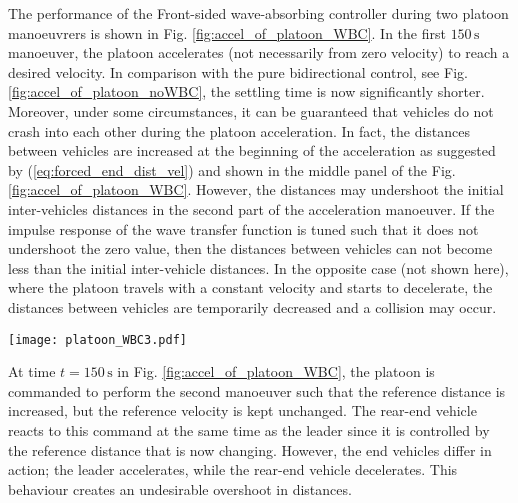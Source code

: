 \documentclass[final,5p,times,twocolumn]{elsarticle}
\begin{document}
The performance of the Front-sided wave-absorbing controller during two platoon manoeuvrers is shown in Fig. \ref{fig:accel_of_platoon_WBC}. In the first $150\,\text{s}$ manoeuver, the platoon accelerates (not necessarily from zero velocity) to reach a desired velocity. In comparison with the pure bidirectional control, see Fig. \ref{fig:accel_of_platoon_noWBC}, the settling time is now significantly shorter. Moreover, under some circumstances, it can be guaranteed that vehicles do not crash into each other during the platoon acceleration. In fact, the distances between vehicles are increased at the beginning of the acceleration as suggested by (\ref{eq:forced_end_dist_vel}) and shown in the middle panel of the Fig. \ref{fig:accel_of_platoon_WBC}. However, the distances may undershoot the initial inter-vehicles distances in the second part of the acceleration manoeuver. If the impulse response of the wave transfer function is tuned such that it does not undershoot the zero value, then the distances between vehicles can not become less than the initial inter-vehicle distances. In the opposite case (not shown here), where the platoon travels with a constant velocity and starts to decelerate, the distances between vehicles are temporarily decreased and a collision may occur.

\begin{figure*}[!htbp]
 \centering
  \texttt{[image: platoon\_WBC3.pdf]}
  \caption{Simulation of two platoon manoeuvrers with the Front-sided wave-absorbing controller. At the beginning, the vehicles are standing still separated by one meter. For the first manoeuver, the platoon is commanded to accelerate to $v_{\text{ref}}=1\,\text{ms}^{-1}$ with $d_{\text{ref}} = 1\,\text{m}$ starting at time $t=0\,\text{s}$.  At time $t = 150\,\text{s}$, the platoon is commanded to perform the second manoeuver such that the reference distance is increased to $d_{\text{ref}} = 1.5\,\text{m}$ without changing the reference velocity.}
  \label{fig:accel_of_platoon_WBC}
\end{figure*}

At time $t = 150\,\text{s}$ in Fig. \ref{fig:accel_of_platoon_WBC}, the platoon is commanded to perform the second manoeuver such that the reference distance is increased, but the reference velocity is kept unchanged. The rear-end vehicle reacts to this command at the same time as the leader since it is controlled by the reference distance that is now changing. However, the end vehicles differ in action; the leader accelerates, while the rear-end vehicle decelerates. This behaviour creates an undesirable overshoot in distances.
\end{document}
